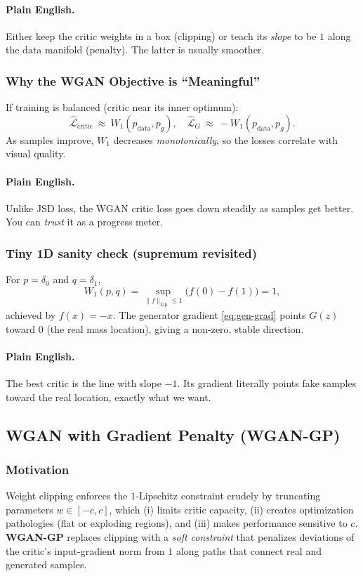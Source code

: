\documentclass[11pt]{article}
\theoremstyle{remark}
\begin{document}
\paragraph{Plain English.}
Either keep the critic weights in a box (clipping) or teach its \emph{slope} to be $1$ along the data manifold (penalty). The latter is usually smoother.

\subsubsection{Why the WGAN Objective is ``Meaningful''}
If training is balanced (critic near its inner optimum):
\[
\widehat{\mathcal{L}}_{\text{critic}}\ \approx\ W_1(p_{\text{data}},p_g),
\quad
\widehat{\mathcal{L}}_{G}\ \approx\ -W_1(p_{\text{data}},p_g).
\]
As samples improve, $W_1$ decreases \emph{monotonically}, so the losses correlate with visual quality.

\paragraph{Plain English.}
Unlike JSD loss, the WGAN critic loss goes down steadily as samples get better. You can \emph{trust} it as a progress meter.

\subsubsection*{Tiny 1D sanity check (supremum revisited)}
For $p=\delta_0$ and $q=\delta_1$,
\[
W_1(p,q)=\sup_{\|f\|_{\text{Lip}}\le 1}\big(f(0)-f(1)\big)=1,
\]
achieved by $f(x)=-x$. The generator gradient \eqref{eq:gen-grad} points $G(z)$ toward $0$ (the real mass location), giving a non-zero, stable direction.

\paragraph{Plain English.}
The best critic is the line with slope $-1$. Its gradient literally points fake samples toward the real location, exactly what we want.

\subsection{WGAN with Gradient Penalty (WGAN-GP)}

\subsubsection{Motivation}
Weight clipping enforces the $1$-Lipschitz constraint crudely by truncating parameters $w\!\in\![-c,c]$, which (i) limits critic capacity, (ii) creates optimization pathologies (flat or exploding regions), and (iii) makes performance sensitive to $c$.
\textbf{WGAN-GP} replaces clipping with a \emph{soft constraint} that penalizes deviations of the critic's input-gradient norm from $1$ along paths that connect real and generated samples.
\end{document}
